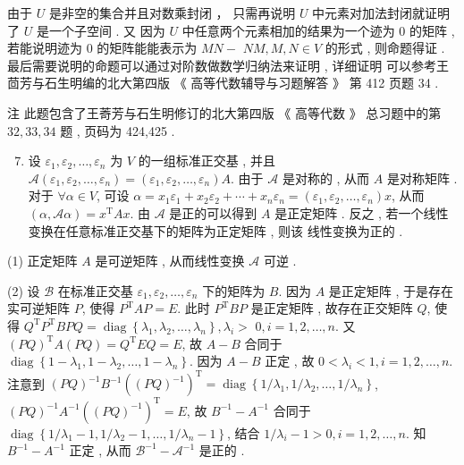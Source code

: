 \documentclass[10pt]{article}
\begin{document}
 由于  $U$  是非空的集合并且对数乘封闭 ， 只需再说明  $U$  中元素对加法封闭就证明了  $U$  是一个子空间 .  又   因为  $U$  中任意两个元素相加的结果为一个迹为  0  的矩阵 ,  若能说明迹为  0  的矩阵能能表示为  $M N-$ $N M, M, N \in V$  的形式 ,  则命题得证 .  最后需要说明的命题可以通过对阶数做数学归纳法来证明 ,  详细证明   可以参考王茴芳与石生明编的北大第四版 《 高等代数辅导与习题解答 》 第  412  页题  34 .

 注   此题包含了王䓫芳与石生明修订的北大第四版 《 高等代数 》 总习题中的第  $32,33,34$  题 ,  页码为  424,425 .

\begin{enumerate}
  \setcounter{enumi}{6}
  \item  设  $\varepsilon_{1}, \varepsilon_{2}, \ldots, \varepsilon_{n}$  为  $V$  的一组标准正交基 ,  并且  $\mathcal{A}\left(\varepsilon_{1}, \varepsilon_{2}, \ldots, \varepsilon_{n}\right)=\left(\varepsilon_{1}, \varepsilon_{2}, \ldots, \varepsilon_{n}\right) A$.  由于  $\mathcal{A}$  是对称的 ,  从而  $A$  是对称矩阵 .  对于  $\forall \alpha \in V$,  可设  $\alpha=x_{1} \varepsilon_{1}+x_{2} \varepsilon_{2}+\cdots+x_{n} \varepsilon_{n}=\left(\varepsilon_{1}, \varepsilon_{2}, \ldots, \varepsilon_{n}\right) x$,  从而  $(\alpha, \mathcal{A} \alpha)=x^{\mathrm{T}} A x$.  由  $\mathcal{A}$  是正的可以得到  $A$  是正定矩阵 .  反之 ,  若一个线性变换在任意标准正交基下的矩阵为正定矩阵 ,  则该   线性变换为正的 .
\end{enumerate}
(1)  正定矩阵  $A$  是可逆矩阵 ,  从而线性变换  $\mathcal{A}$  可逆 .

(2)  设  $\mathcal{B}$  在标准正交基  $\varepsilon_{1}, \varepsilon_{2}, \ldots, \varepsilon_{n}$  下的矩阵为  $B$.  因为  $A$  是正定矩阵 ,  于是存在实可逆矩阵  $P$,  使得  $P^{\mathrm{T}} A P=E$.  此时  $P^{\mathrm{T}} B P$  是正定矩阵 ,  故存在正交矩阵  $Q$,  使得  $Q^{\mathrm{T}} P^{\mathrm{T}} B P Q=\operatorname{diag}\left\{\lambda_{1}, \lambda_{2}, \ldots, \lambda_{n}\right\}, \lambda_{i}>$ $0, i=1,2, \ldots, n$.  又  $(P Q)^{\mathrm{T}} A(P Q)=Q^{\mathrm{T}} E Q=E$,  故  $A-B$  合同于  $\operatorname{diag}\left\{1-\lambda_{1}, 1-\lambda_{2}, \ldots, 1-\lambda_{n}\right\}$.  因为  $A-B$  正定 ,  故  $0<\lambda_{i}<1, i=1,2, \ldots, n$.  注意到  $(P Q)^{-1} B^{-1}\left((P Q)^{-1}\right)^{\mathrm{T}}=\operatorname{diag}\left\{1 / \lambda_{1}, 1 / \lambda_{2}, \ldots, 1 / \lambda_{n}\right\}$, $(P Q)^{-1} A^{-1}\left((P Q)^{-1}\right)^{\mathrm{T}}=E$,  故  $B^{-1}-A^{-1}$  合同于  $\operatorname{diag}\left\{1 / \lambda_{1}-1,1 / \lambda_{2}-1, \ldots, 1 / \lambda_{n}-1\right\}$,  结合  $1 / \lambda_{i}-1>0, i=1,2, \ldots, n$.  知  $B^{-1}-A^{-1}$  正定 ,  从而  $\mathcal{B}^{-1}-\mathcal{A}^{-1}$  是正的 .
\end{document}
